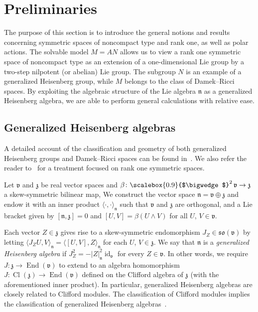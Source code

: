 \documentclass[12pt, a4paper]{amsart}
\newcommand{\g}{\mathfrak}
\newcommand{\End}{\operatorname{End}}
\newcommand{\id}{\operatorname{id}}
\newcommand{\ext}[1]{\ensuremath{\scalebox{0.9}{$\bigwedge$}^{#1}\,}}
\theoremstyle{definition}
\begin{document}
\section{Preliminaries}\label{sec:preliminaries}

The purpose of this section is to introduce the general notions and results concerning symmetric spaces of noncompact type and rank one, as well as polar actions.
The solvable model $M=AN$ allows us to view a rank one symmetric space of noncompact type as an extension of a one-dimensional Lie group by a two-step nilpotent (or abelian) Lie group.
The subgroup $N$ is an example of a generalized Heisenberg group, while $M$ belongs to the class of Damek--Ricci spaces.
By exploiting the algebraic structure of the Lie algebra $\g{n}$ as a generalized Heisenberg algebra, we are able to perform general calculations with relative ease.


\subsection{Generalized Heisenberg algebras}\label{sec:heisenberg}\hfill

A detailed account of the classification and geometry of both generalized Heisenberg groups and Damek--Ricci spaces can be found in~\cite{BerndtTricerriVanHecke}.
We also refer the reader to~\cite{cowling-dooley-koranyi-ricci} for a treatment focused on rank one symmetric spaces.

Let $\g{v}$ and $\g{z}$ be real vector spaces and $\beta\colon \ext{2} \g{v}\to \g{z}$
a skew-symmetric bilinear map,
We construct the vector space $\g{n}=\g{v}\oplus \g{z}$ and endow it with an inner product 
$\langle \cdot , \cdot \rangle_{\g{n}}$ such that $\g{v}$ and $\g{z}$ are orthogonal, 
and a Lie bracket given by $[\g{n},\g{z}]=0$ and $[U,V]=\beta(U\wedge V)$ for all $U$, $V\in \g{v}$.

Each vector $Z\in \g{z}$ gives rise to a skew-symmetric endomorphism $J_Z \in \g{so}(\g{v})$ by letting 
$\langle J_Z U, V \rangle_{\g{n}} = \langle [U,V], Z\rangle_{\g{n}}$ for each $U$, $V\in \g{z}$.
We say that $\g{n}$ is a \textit{generalized Heisenberg algebra} if 
$J_Z^2=-\lvert Z \rvert_{\g{n}} ^2 \id_{\g{v}}$ for every $Z\in \g{v}$.
In other words, we require $J\colon \g{z}\to \End(\g{v})$ to extend to an algebra homomorphism $J\colon \operatorname{Cl}(\g{z})\to \End(\g{v})$ defined on the Clifford algebra of $\g{z}$ (with the aforementioned inner product).
In particular, generalized Heisenberg algebras are closely related to Clifford modules.
The classification of Clifford modules implies the classification of generalized Heisenberg algebras~\cite[Section~3.1.2]{BerndtTricerriVanHecke}.
\end{document}
